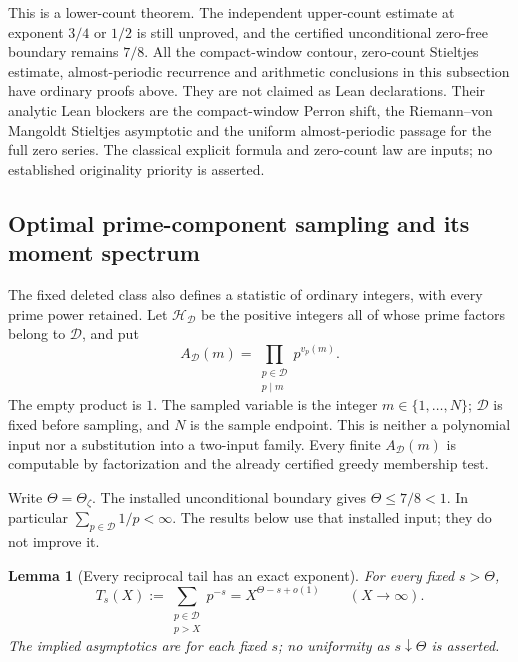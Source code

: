 \documentclass[11pt]{article}
\newtheorem{lemma}[theorem]{Lemma}
\theoremstyle{definition}
\begin{document}
This is a lower-count theorem. The independent upper-count estimate
at exponent $3/4$ or $1/2$ is still unproved, and the certified
unconditional zero-free boundary remains $7/8$.
All the compact-window contour, zero-count Stieltjes estimate,
almost-periodic recurrence and arithmetic conclusions in this subsection
have ordinary proofs above. They are not claimed as Lean declarations.
Their analytic Lean blockers are the compact-window Perron shift,
the Riemann--von Mangoldt Stieltjes asymptotic and the uniform
almost-periodic passage for the full zero series.
The classical explicit formula and zero-count law are inputs;
no established originality priority is asserted.

\subsection{Optimal prime-component sampling and its moment spectrum}
\label{sec:deleted-component-sampling}

The fixed deleted class also defines a statistic of ordinary integers,
with every prime power retained.
Let $\mathcal H_{\mathcal D}$ be the positive integers all of whose
prime factors belong to $\mathcal D$, and put
\[
 A_{\mathcal D}(m)=\prod_{\substack{p\in\mathcal D\\p\mid m}}p^{v_p(m)}.
\]
The empty product is $1$.
The sampled variable is the integer $m\in\{1,\ldots,N\}$;
$\mathcal D$ is fixed before sampling, and $N$ is the sample endpoint.
This is neither a polynomial input nor a substitution into a two-input
family. Every finite $A_{\mathcal D}(m)$ is computable by factorization
and the already certified greedy membership test.

Write $\Theta=\Theta_\zeta$.
The installed unconditional boundary gives $\Theta\le7/8<1$.
In particular $\sum_{p\in\mathcal D}1/p<\infty$.
The results below use that installed input; they do not improve it.

\begin{lemma}[Every reciprocal tail has an exact exponent]
\label{lem:deleted-prime-weighted-tail}
For every fixed $s>\Theta$,
\begin{equation}
 T_s(X):=\sum_{\substack{p\in\mathcal D\\p>X}}p^{-s}
                       =X^{\Theta-s+o(1)}\qquad(X\to\infty).
 \label{eq:deleted-prime-weighted-tail}
\end{equation}
The implied asymptotics are for each fixed $s$; no uniformity as
$s\downarrow\Theta$ is asserted.
\end{lemma}
\end{document}
